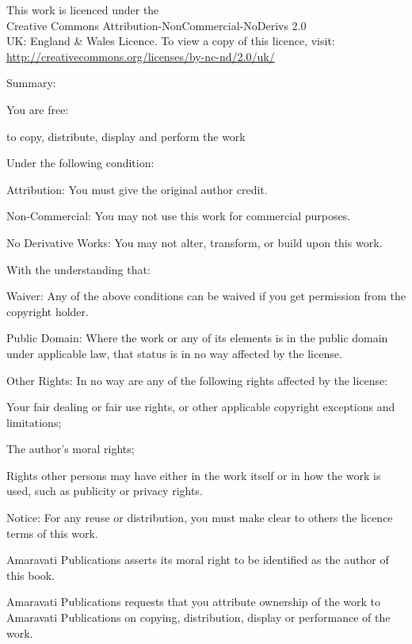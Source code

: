 
{\ccdetailssize\setlength{\parindent}{0em}%
\raggedright

\label{cc-details}
{\centering

{\large\ccbyncnd}
\bigskip

This work is licenced under the\\ Creative Commons Attribution-NonCommercial-NoDerivs 2.0\\ UK: England \& Wales Licence. To view a copy of this licence, visit:\\
\href{http://creativecommons.org/licenses/by-nc-nd/2.0/uk/}{http://creativecommons.org/licenses/by-nc-nd/2.0/uk/}

}
\bigskip

Summary:
\bigskip

You are free:

\begin{packeditemize}
\item to copy, distribute, display and perform the work
\end{packeditemize}

Under the following condition:
\begin{packeditemize}
\item Attribution: You must give the original author credit.
\item Non-Commercial: You may not use this work for commercial purposes.
\item No Derivative Works: You may not alter, transform, or build upon this work.
\end{packeditemize}

With the understanding that:
\begin{packeditemize}
\item Waiver: Any of the above conditions can be waived if you get permission from the copyright holder.
\item Public Domain: Where the work or any of its elements is in the public domain under applicable law, that status is in no way affected by the license.
\item Other Rights: In no way are any of the following rights affected by the license:
\begin{packeditemize}
\item Your fair dealing or fair use rights, or other applicable copyright exceptions and limitations;
\item The author's moral rights;
\item Rights other persons may have either in the work itself or in how the work is used, such as publicity or privacy rights.
\end{packeditemize}
\item Notice: For any reuse or distribution, you must make clear to others the licence terms of this work.
\end{packeditemize}

Amaravati Publications asserts its moral right to be identified as the author of this book.
\bigskip

Amaravati Publications requests that you attribute ownership of the work to Amaravati Publications on copying, distribution, display or performance of the work.

}
